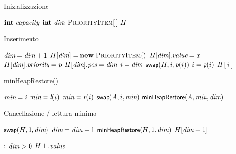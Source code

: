 \begin{frame}{Inizializzazione}
    
\begin{Procedure}
\caption[A]{\Heap}
$\INTEGER\ \heapsize$
$\INTEGER\ \heapcount$
$\textsc{PriorityItem}[\,]\ H$
\BlankLine

\end{Procedure}

\end{frame}

\begin{frame}{Inserimento}

\begin{Procedure}
\caption[A]{\PriorityItem\ \heapinsert(\Item $x$, \INTEGER\ $p$)}
\precondition{$\heapcount < \heapsize$}
\BlankLine
$\textit{dim} = \textit{dim}+1$\;
$H[\heapcount] = \NEW\ \PriorityItem()$\;
$H[\textit{dim}].\textit{value} = x$\;
$H[\textit{dim}].\textit{priority} = p$\;
$H[\textit{dim}].\textit{pos} = \textit{dim}$\;
\INTEGER $i = \textit{dim}$\;
{
  $\textsf{{\small swap}}(H, i, \textit{p}(i))$\;
  $i = \textit{p}(i)$\;
}
\Return $H[i]$\;
\end{Procedure}


\end{frame}

\begin{frame}{minHeapRestore()}
    
\begin{Procedure}
\caption[A]{\minheapify($\PriorityItem[\,]\ A$, \INTEGER $i$, \INTEGER \heapcount)}

\INTEGER $\textit{min} = i$\;
{
  $\textit{min} = \textit{l}(i)$
}
{
  $\textit{min} = \textit{r}(i)$
}
{
  $\textsf{{\small swap}}(A, i, \textit{min})$\;
  $\textsf{{\small minHeapRestore}}(A, \textit{min}, \textit{dim})$\;
}
\end{Procedure}

\end{frame}

\begin{frame}{Cancellazione / lettura minimo}

\begin{Procedure}
\caption[A]{\Item\ \heapdeletemin()}
\BlankLine
$\textsf{{\small swap}}(H, 1, \textit{dim})$\;
$\textit{dim} = \textit{dim}-1$\;
$\textsf{{\small minHeapRestore}}(H, 1, \textit{dim})$\;
\Return $H[\textit{dim}+1]$\;
\end{Procedure}

\begin{Procedure}
\caption[A]{\Item \heapmin()}
  \PRECONDITION: $\textit{dim} > 0$\; 
  \BlankLine
  \Return $H[1].\textit{value}$\;
\end{Procedure}

\end{frame}

